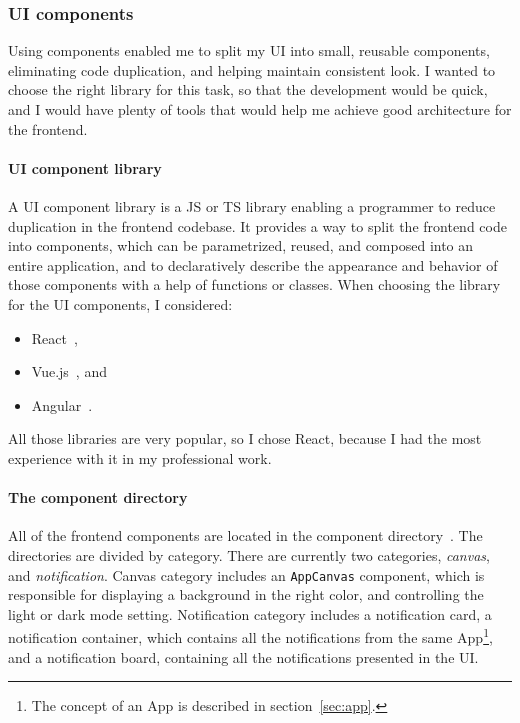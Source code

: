 \subsubsection{UI components}\label{sec:ui-components}

Using components enabled me to split my \ac{UI}
into small, reusable components,
eliminating code duplication,
and helping maintain consistent look.
I wanted to choose the right library
for this task,
so that the development would be quick,
and I would have plenty of tools
that would help me achieve
good architecture for the frontend.

\paragraph*{UI component library}\label{sec:ui-component-library}

A \ac{UI} component library is a \acf{JS} or \acf{TS} library
enabling a programmer to reduce duplication
in the frontend codebase.
It provides a way to split the frontend code into components,
which can be parametrized, reused, and composed into an entire application,
and to declaratively describe
the appearance and behavior of those components
with a help of functions or classes.
When choosing the library for the \ac{UI} components, I considered:

\begin{itemize}
  \item
        React~\cite{oshannessy_react_2022},
  \item
        Vue.js~\cite{you_vuejs_2022}, and
  \item
        Angular~\cite{kalpakas_angular_2022}.
\end{itemize}

All those libraries are very popular,
so I chose React,
because I had the most experience with it in my professional work.

\paragraph*{The component directory}\label{sec:the-component-directory}

All of the frontend components
are located in the component directory~\cite{sewera_notipie_2022-3}.
The directories are divided by category.
There are currently two categories,
\textit{canvas}, and
\textit{notification}.
Canvas category includes
an \texttt{AppCanvas} component,
which is responsible for displaying
a background in the right color,
and controlling the light or dark mode setting.
Notification category includes
a notification card,
a notification container,
which contains all the notifications
from the same App\footnote{
  The concept of an App is described
  in section~\ref{sec:app}.
}, and a notification board,
containing all the notifications
presented in the \ac{UI}.

